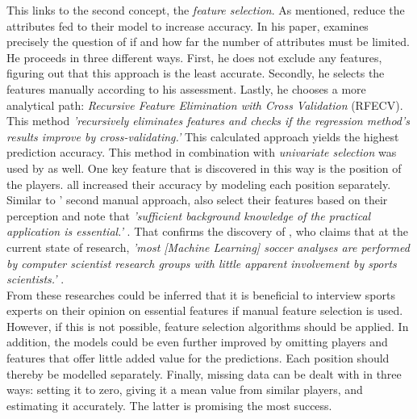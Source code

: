 \indent This links to the second concept, the \emph{feature selection}. As mentioned, \citet{deng_analysis_2020,egidi_bayesian_2018} reduce the attributes fed to their model to increase accuracy. In his paper, \citet{lutz_fantasy_2015} examines precisely the question of if and how far the number of attributes must be limited. He proceeds in three different ways. First, he does not exclude any features, figuring out that this approach is the least accurate. Secondly, he selects the features manually according to his assessment. Lastly, he chooses a more analytical path: \emph{Recursive Feature Elimination with Cross Validation} (RFECV). This method \emph{'recursively eliminates features and checks if the regression method's results improve by cross-validating.'} \parencite[, p. 4]{lutz_fantasy_2015} This calculated approach yields the highest prediction accuracy. This method in combination with \emph{univariate selection} was used by \citet{anik_players_2018} as well. One key feature that is discovered in this way is the position of the players. \citet{lutz_fantasy_2015,demediuk_performance_2021,egidi_bayesian_2018} all increased their accuracy by modeling each position separately. Similar to \citeauthor{lutz_fantasy_2015}' second manual approach, \citeauthor{deng_analysis_2020} also select their features based on their perception and note that \emph{'sufficient background knowledge of the practical application is essential.'} \parencite[, p. 4]{deng_analysis_2020}. That confirms the discovery of \citeauthor{rein_big_2016}, who claims that at the current state of research, \emph{'most [Machine Learning] soccer analyses are performed by computer scientist research groups with little apparent involvement by sports scientists.'} \parencite[, p. 6]{rein_big_2016}. \\
\indent From these researches could be inferred that it is beneficial to interview sports experts on their opinion on essential features if manual feature selection is used. However, if this is not possible, feature selection algorithms should be applied. In addition, the models could be even further improved by omitting players and features that offer little added value for the predictions. Each position should thereby be modelled separately. Finally, missing data can be dealt with in three ways: setting it to zero, giving it a mean value from similar players, and estimating it accurately. The latter is promising the most success.

